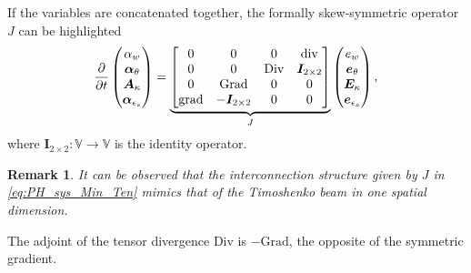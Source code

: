 \documentclass{ifacconf}
\newtheorem{remark}{Remark}
\begin{document}
If the variables are concatenated together, the formally skew-symmetric operator $J$ can be highlighted 
\begin{equation}
\label{eq:PH_sys_Min_Ten}
\diffp{}{t}
\begin{pmatrix}
\alpha_w \\
\bm\alpha_\theta \\
\bm{A}_\kappa \\
\bm\alpha_{\epsilon_s} \\
\end{pmatrix} = 
\underbrace{\begin{bmatrix}
	0  & 0  & 0  & \mathrm{div} \\
	0 & 0 &  \mathrm{Div} & \bm{I}_{2 \times 2}\\
	0  & \mathrm{Grad}  & 0  & 0\\
	\mathrm{grad} & -\bm{I}_{2 \times 2} &  0 & 0  \\
	\end{bmatrix}}_{J}
\begin{pmatrix}
e_w \\
\bm{e}_{\theta} \\
\bm{E}_{\kappa} \\
\bm{e}_{\epsilon_s} \\
\end{pmatrix},
\end{equation}
where $\bm{I}_{2 \times 2}: \mathbb{V} \rightarrow \mathbb{V}$ is the identity operator.
\begin{remark}
	It can be observed that the interconnection structure given by $J$ in \eqref{eq:PH_sys_Min_Ten} mimics that of the Timoshenko beam in one spatial dimension.
\end{remark}


\begin{thm}
	The adjoint of the tensor divergence $\mathrm{Div}$ is $- \mathrm{Grad}$, the opposite of the symmetric gradient.
\end{thm}
\end{document}
